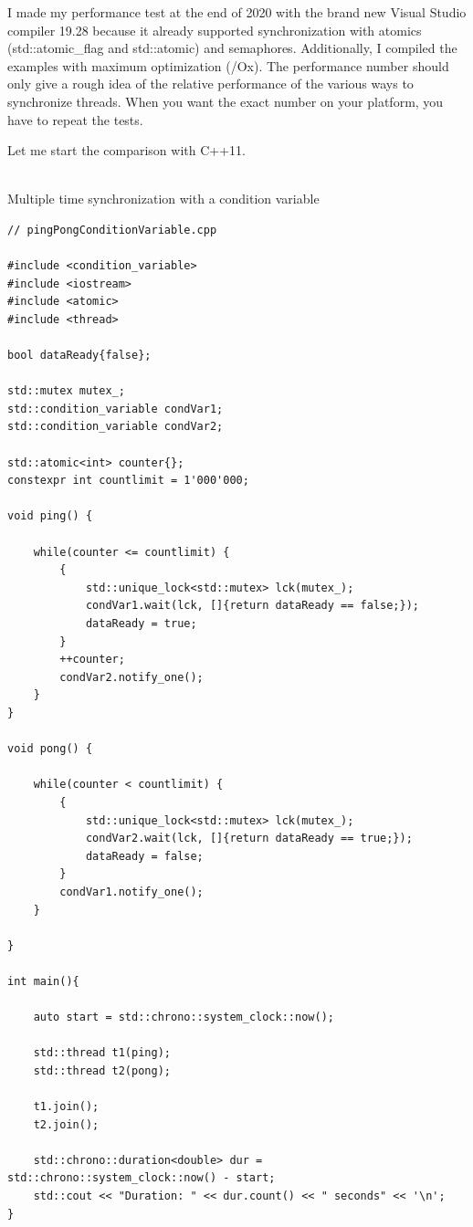 \begin{tcolorbox}[colback=blue!5!white,colframe=blue!75!black,title={About the Numbers}]
I made my performance test at the end of 2020 with the brand new Visual Studio compiler 19.28 because it already supported synchronization with atomics (std::atomic\_flag and std::atomic) and semaphores. Additionally, I compiled the examples with maximum optimization (/Ox). The performance number should only give a rough idea of the relative performance of the various ways to synchronize threads. When you want the exact number on your platform, you have to repeat the tests.
\end{tcolorbox}

Let me start the comparison with C++11.


\hspace*{\fill} \\ %
\noindent
Multiple time synchronization with a condition variable
\begin{lstlisting}[style=styleCXX]
// pingPongConditionVariable.cpp

#include <condition_variable>
#include <iostream>
#include <atomic>
#include <thread>

bool dataReady{false};

std::mutex mutex_;
std::condition_variable condVar1;
std::condition_variable condVar2;

std::atomic<int> counter{};
constexpr int countlimit = 1'000'000;

void ping() {

	while(counter <= countlimit) {
		{
			std::unique_lock<std::mutex> lck(mutex_);
			condVar1.wait(lck, []{return dataReady == false;});
			dataReady = true;
		}
		++counter;
		condVar2.notify_one();
	}
}

void pong() {

	while(counter < countlimit) {
		{
			std::unique_lock<std::mutex> lck(mutex_);
			condVar2.wait(lck, []{return dataReady == true;});
			dataReady = false;
		}
		condVar1.notify_one();
	}

}

int main(){

	auto start = std::chrono::system_clock::now();
	
	std::thread t1(ping);
	std::thread t2(pong);
	
	t1.join();
	t2.join();
	
	std::chrono::duration<double> dur = std::chrono::system_clock::now() - start;
	std::cout << "Duration: " << dur.count() << " seconds" << '\n';
}
\end{lstlisting}

